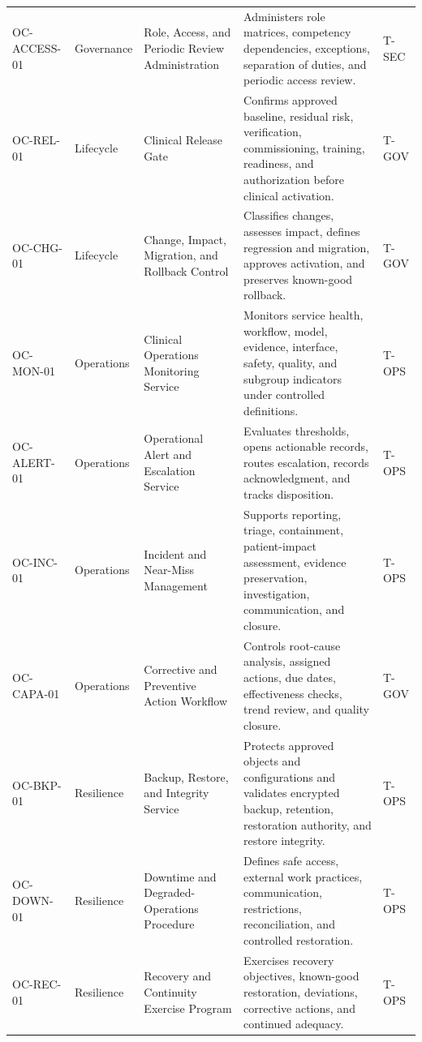 \documentclass[11pt,letterpaper]{article}
\begin{document}
\begin{scriptsize}
\begin{longtable}{@{}L{0.15\textwidth}L{0.11\textwidth}L{0.21\textwidth}L{0.38\textwidth}L{0.08\textwidth}@{}}
\addlinespace[2pt]
\mbox{OC-ACCESS-01} & Governance & Role, Access, and Periodic Review Administration & Administers role matrices, competency dependencies, exceptions, separation of duties, and periodic access review. & T-SEC \\
\addlinespace[2pt]
\mbox{OC-REL-01} & Lifecycle & Clinical Release Gate & Confirms approved baseline, residual risk, verification, commissioning, training, readiness, and authorization before clinical activation. & T-GOV \\
\addlinespace[2pt]
\mbox{OC-CHG-01} & Lifecycle & Change, Impact, Migration, and Rollback Control & Classifies changes, assesses impact, defines regression and migration, approves activation, and preserves known-good rollback. & T-GOV \\
\addlinespace[2pt]
\mbox{OC-MON-01} & Operations & Clinical Operations Monitoring Service & Monitors service health, workflow, model, evidence, interface, safety, quality, and subgroup indicators under controlled definitions. & T-OPS \\
\addlinespace[2pt]
\mbox{OC-ALERT-01} & Operations & Operational Alert and Escalation Service & Evaluates thresholds, opens actionable records, routes escalation, records acknowledgment, and tracks disposition. & T-OPS \\
\addlinespace[2pt]
\mbox{OC-INC-01} & Operations & Incident and Near-Miss Management & Supports reporting, triage, containment, patient-impact assessment, evidence preservation, investigation, communication, and closure. & T-OPS \\
\addlinespace[2pt]
\mbox{OC-CAPA-01} & Operations & Corrective and Preventive Action Workflow & Controls root-cause analysis, assigned actions, due dates, effectiveness checks, trend review, and quality closure. & T-GOV \\
\addlinespace[2pt]
\mbox{OC-BKP-01} & Resilience & Backup, Restore, and Integrity Service & Protects approved objects and configurations and validates encrypted backup, retention, restoration authority, and restore integrity. & T-OPS \\
\addlinespace[2pt]
\mbox{OC-DOWN-01} & Resilience & Downtime and Degraded-Operations Procedure & Defines safe access, external work practices, communication, restrictions, reconciliation, and controlled restoration. & T-OPS \\
\addlinespace[2pt]
\mbox{OC-REC-01} & Resilience & Recovery and Continuity Exercise Program & Exercises recovery objectives, known-good restoration, deviations, corrective actions, and continued adequacy. & T-OPS \\

\end{longtable}
\end{scriptsize}
\end{document}
